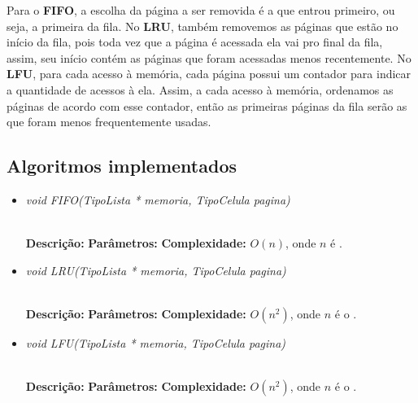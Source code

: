 \documentclass[12pt]{article}
\begin{document}
Para o \textbf{FIFO}, a escolha da página a ser removida é a que entrou primeiro, ou seja, a primeira da fila. No \textbf{LRU}, também removemos as páginas que estão no início da fila, pois toda vez que a página é acessada ela vai pro final da fila, assim, seu início contém as páginas que foram acessadas menos recentemente. No \textbf{LFU}, para cada acesso à memória, cada página possui um contador para indicar a quantidade de acessos à ela. Assim, a cada acesso à memória, ordenamos as páginas de acordo com esse contador, então as primeiras páginas da fila serão as que foram menos frequentemente usadas.

\subsection{Algoritmos implementados}

\vspace{0.2 true cm}

\begin{itemize}
 \item \begin{large}\textit{void FIFO(TipoLista * memoria, TipoCelula pagina)}\end{large}\\
 \subitem \textbf{Descrição:}
 \subitem \textbf{Parâmetros:}
 \subitem \textbf{Complexidade:} $O(n)$, onde $n$ é .
\end{itemize}

\vspace{0.2 true cm}

\begin{itemize}
 \item \begin{large}\textit{void LRU(TipoLista * memoria, TipoCelula pagina)}\end{large}\\
 \subitem \textbf{Descrição:}
 \subitem \textbf{Parâmetros:}
 \subitem \textbf{Complexidade:} $O(n^2)$, onde $n$ é o .
\end{itemize}

\vspace{0.2 true cm}

\begin{itemize}
 \item \begin{large}\textit{void LFU(TipoLista * memoria, TipoCelula pagina)}\end{large}\\
 \subitem \textbf{Descrição:}
 \subitem \textbf{Parâmetros:}
 \subitem \textbf{Complexidade:} $O(n^2)$, onde $n$ é o .
\end{itemize}
\end{document}
